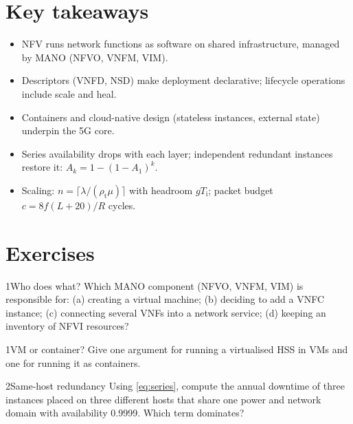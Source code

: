 \documentclass[11pt,a4paper]{article}
\begin{document}
\section{Key takeaways}
\begin{takeawaybox}
\begin{itemize}
  \item NFV runs network functions as software on shared infrastructure, managed by MANO (NFVO, VNFM, VIM).
  \item Descriptors (VNFD, NSD) make deployment declarative; lifecycle operations include scale and heal.
  \item Containers and cloud-native design (stateless instances, external state) underpin the 5G core.
  \item Series availability drops with each layer; independent redundant instances restore it: $A_k = 1-(1-A_1)^k$.
  \item Scaling: $n = \lceil\lambda/(\rho_{\mathrm{t}}\mu)\rceil$ with headroom $gT_\mathrm{i}$; packet budget $c = 8f(L+20)/R$ cycles.
\end{itemize}
\end{takeawaybox}

\section{Exercises}

\begin{exercisebox}{1}{Who does what?}\label{exr:mano}
Which MANO component (NFVO, VNFM, VIM) is responsible for: (a) creating a virtual machine; (b) deciding to add a
VNFC instance; (c) connecting several VNFs into a network service; (d) keeping an inventory of NFVI resources?
\end{exercisebox}

\begin{exercisebox}{1}{VM or container?}\label{exr:vmct}
Give one argument for running a virtualised HSS in VMs and one for running it as containers.
\end{exercisebox}

\begin{exercisebox}{2}{Same-host redundancy}\label{exr:host}
Using \cref{eq:series}, compute the annual downtime of three instances placed on three different hosts that share one
power and network domain with availability 0.9999. Which term dominates?
\end{exercisebox}
\end{document}
